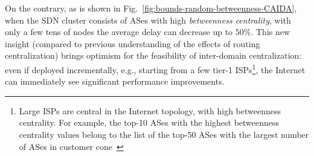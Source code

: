 On the contrary, as is shown in Fig.~\ref{fig:bounds-random-betweenness-CAIDA}, when the SDN cluster consists of ASes with high \textit{betweenness centrality}, with only a few tens of nodes the average delay can decrease up to $50\%$. This new insight (compared to previous understanding of the effects of routing centralization) brings optimism for the feasibility of inter-domain centralization: even if deployed incrementally, e.g., starting from a few tier-1 ISPs\footnote{Large ISPs are central in the Internet topology, with high betweenness centrality. For example, the top-10 ASes with the highest betweenness centrality values belong to the list of the top-50 ASes with the largest number of ASes in customer cone~\cite{as-rank-website}}, the Internet can immediately see significant performance improvements.




%

%
%
%



